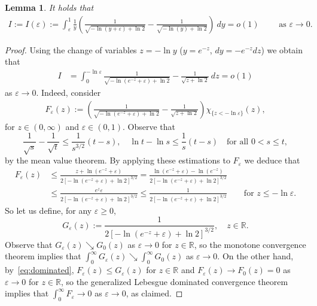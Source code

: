 \documentclass[11pt]{article}
\newcommand{\eps}{{\varepsilon}}
\newcommand{\R}{\mathbb{R}}
\numberwithin{equation}{section}
\newtheorem{lemma}[theorem]{Lemma}
\begin{document}
\begin{lemma}\label{J2:s:aux}
It holds that
\begin{align*}
 I:=I(\eps):=\int_{\eps}^{1}\frac{1}{y}
 \left(
 \frac{1}{\sqrt{-\ln{(y+\eps)+\ln 2}}}-\frac{1}{\sqrt{-\ln (y)+\ln 2}}
 \right)\ dy=o(1)\qquad \text{ as }\eps\to 0.
\end{align*}
\end{lemma}
\begin{proof}
Using the change of variables $z=-\ln y$ ($y=e^{-z}$, $dy=-e^{-z}dz$) we obtain that
\begin{align*}
I&=\int_{0}^{-\ln\eps}\frac{1}{\sqrt{-\ln(e^{-z}+\eps)+\ln 2}}
-
\frac{1}{\sqrt{z+\ln 2}}\ dz=o(1)
\end{align*}
as $\eps\to 0$. Indeed, consider
\begin{align*}
 F_\eps(z) := \left(\frac{1}{\sqrt{-\ln(e^{-z}+\eps)+\ln 2}}
-
\frac{1}{\sqrt{z+\ln 2}}\right)
\chi_{\{z<-\ln\eps\}}(z),
\end{align*}
for $z\in(0,\infty)$ and $\eps \in (0,1)$. Observe that
\begin{equation*}
    \frac{1}{\sqrt{s}} - \frac{1}{\sqrt{t}} \le \frac{1}{s^{3/2}} (t-s), \quad \ln{t} - \ln{s} \le \frac{1}{s}(t-s) \quad \text{for all } 0<s \le t,
\end{equation*}
by the mean value theorem. By applying these estimations to $F_\eps$ we deduce that
\begin{equation} \label{eq:dominated}
\begin{aligned}   
    F_\eps(z) &\le \frac{z+\ln(e^{-z}+\eps)}{2\left[-\ln(e^{-z} +\eps) + \ln 2 \right]^{3/2}} = \frac{\ln(e^{-z}+\eps) - \ln \left( e^{-z} \right)}{2\left[-\ln(e^{-z} +\eps) + \ln 2 \right]^{3/2}} \\
     & \le \frac{e^z \eps}{2\left[-\ln(e^{-z} +\eps) + \ln 2 \right]^{3/2}} \le \frac{1}{2\left[-\ln(e^{-z} +\eps) + \ln 2 \right]^{3/2}} \qquad \text{for } z \le -\ln \eps. 
\end{aligned}
\end{equation}
So let us define, for any $\eps \ge 0$,
\begin{equation*}
    G_\eps(z) := \frac{1}{2\left[-\ln(e^{-z} +\eps) + \ln 2 \right]^{3/2}}, \quad z \in \R.
\end{equation*}
Observe that $G_\eps(z) \searrow G_0(z)$ as $\eps \to 0$ for $z\in\R$, so the monotone convergence theorem implies that $\int_0^\infty G_\eps(z) \searrow \int_0^\infty G_0(z)$ as $\eps \to 0$. On the other hand, by~\eqref{eq:dominated},  $F_\eps(z) \le G_\eps(z)$ for $z \in \R$ and $F_\eps(z)\to F_0(z)=0$ as $\eps\to 0$ for $z\in\R$, so the generalized Lebesgue dominated convergence theorem implies that $\int_0^\infty F_\eps \to 0$ as $\eps \to 0$, as claimed.
\end{proof}
\end{document}
